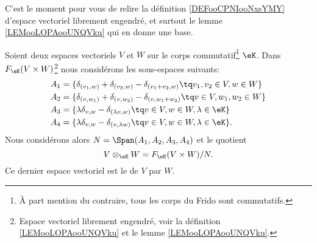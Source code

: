 C'est le moment pour vous de relire la définition \ref{DEFooCPNIooNxsYMY} d'espace vectoriel librement engendré, et surtout le lemme \ref{LEMooLOPAooUNQVku} qui en donne une base.

\begin{definition}       \label{DEFooKTVDooSPzAhH}
	Soient deux espaces vectoriels \( V\) et \( W\) sur le corps commutatif\footnote{À part mention du contraire, tous les corps du Frido sont commutatifs.} \( \eK\). Dans \( F_{\eK}(V\times W)\)\footnote{Espace vectoriel librement engendré, voir la définition \ref{LEMooLOPAooUNQVku} et le lemme \ref{LEMooLOPAooUNQVku}.} nous considérons les sous-espaces suivants:
	\begin{subequations}
		\begin{align}
			A_1 & =\{ \delta_{(v_1,w)}+\delta_{(v_2,w)}-\delta_{(v_1+v_2,w)}\tq v_1,v_2\in V,w\in W  \}                             \\
			A_2 & =\{ \delta_{(v,w_1)}+\delta_{(v,w_2)}-\delta_{(v,w_1+w_2)}\tq v\in V,w_1,w_2\in W  \} \label{SUBEQooSHBJooJLPVbK} \\
			A_3 & =\{ \lambda\delta_{v,w}-\delta_{(\lambda v, w)}\tq v\in V,w\in W,\lambda\in \eK \}                                \\
			A_4 & =\{ \lambda\delta_{v,w}-\delta_{(v,\lambda w)}\tq v\in V,w\in W,\lambda\in \eK \}.
		\end{align}
	\end{subequations}
	Nous considérons alors \( N=\Span(A_1,A_2,A_3,A_4)\) et le quotient
	\begin{equation}
		V\otimes_{\eK}W=F_{\eK}(V\times W)/N.
	\end{equation}
	Ce dernier espace vectoriel est le  de \( V\) par \( W\).
\end{definition}

